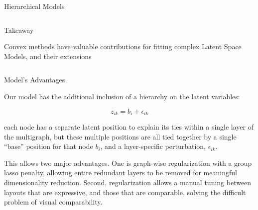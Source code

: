 \documentclass[final]{beamer}
\newlength{\onecolwid}
\newlength{\twocolwid}
\begin{document}
\begin{frame}[t]
\begin{columns}[t]
\begin{column}{\twocolwid}
\begin{columns}[t,totalwidth=\twocolwid]
\begin{column}{\onecolwid}
\begin{block}{Hierarchical Models}
\end{block}


\end{column} %

\end{columns} %


\begin{alertblock}{Takeaway}

Convex methods have valuable contributions for fitting complex Latent Space Models, and their extensions

\end{alertblock}


\begin{columns}[t,totalwidth=\twocolwid] %

\begin{column}{\onecolwid} %


\begin{block}{Model's Advantages}

Our model has the additional inclusion of a hierarchy on the latent variables:

\[
z_{ik} = b_i + \epsilon_{ik}
\]

each node has a separate latent position to explain its ties within a
single layer of the multigraph, but these multiple positions are all
tied together by a single ``base'' position for that node $b_i$, and a
layer-specific perturbation, $\epsilon_{ik}$.

This allows two major advantages. One is graph-wise regularization
with a group lasso penalty, allowing entire redundant layers to be
removed for meaningful dimensionality reduction. Second,
regularization allows a manual tuning between layouts that are
expressive, and those that are comparable, solving the difficult
problem of visual comparability.


\end{block}
\end{column}
\end{columns}
\end{column}
\end{columns}
\end{frame}
\end{document}
